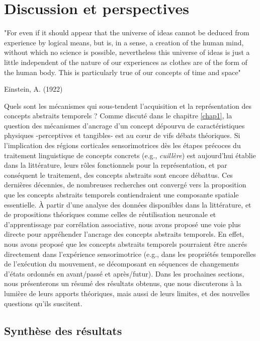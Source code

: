 \documentclass[
  a4paper,12pt,twoside,onecolumn,openright,final,oldfontcommands]{memoir}
\newcommand{\initial}[1]{
	\lettrine[lines=3,lhang=0.33,nindent=0em]{
		\color{gray}
     		{\textsc{#1}}}{}}
\begin{document}
\hypertarget{chap6}{%
\chapter{Discussion et perspectives}\label{chap6}}

\epigraph{"For even if it should appear that the universe of ideas cannot be deduced from experience by logical means, but is, in a sense, a creation of the human mind, without which no science is possible, nevertheless this universe of ideas is just a little independent of the nature of our experiences as clothes are of the form of the human body. This is particularly true of our concepts of time and space"} {Einstein, A. (1922)}

\initial{Q}uels sont les mécanismes qui sous-tendent l'acquisition et la représentation des concepts abstraits temporels ? Comme discuté dans le chapitre \ref{chap1}, la question des mécanismes d'ancrage d'un concept dépourvu de caractéristiques physiques -perceptives et tangibles- est au cœur de vifs débats théoriques. Si l'implication des régions corticales sensorimotrices dès les étapes précoces du traitement linguistique de concepts concrets (e.g., \emph{cuillère}) est aujourd'hui établie dans la littérature, leurs rôles fonctionnels pour la représentation, et par conséquent le traitement, des concepts abstraits sont encore débattus. Ces dernières décennies, de nombreuses recherches ont convergé vers la proposition que les concepts abstraits temporels contiendraient une composante spatiale essentielle. À partir d'une analyse des données disponibles dans la littérature, et de propositions théoriques comme celles de réutilisation neuronale et d'apprentissage par corrélation associative, nous avons proposé une voie plus directe pour appréhender l'ancrage des concepts abstraits temporels. En effet, nous avons proposé que les concepts abstraits temporels pourraient être ancrés directement dans l'expérience sensorimotrice (e.g., dans les propriétés temporelles de l'exécution du mouvement, se décomposant en séquences de changements d'états ordonnés en avant/passé et après/futur). Dans les prochaines sections, nous présenterons un résumé des résultats obtenus, que nous discuterons à la lumière de leurs apports théoriques, mais aussi de leurs limites, et des nouvelles questions qu'ils suscitent.

\hypertarget{synthuxe8se-des-ruxe9sultats}{%
\section{Synthèse des résultats}\label{synthuxe8se-des-ruxe9sultats}}
\end{document}
